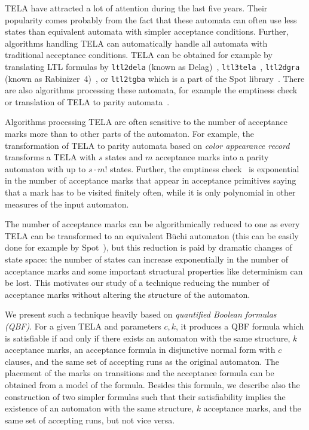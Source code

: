 \documentclass[runningheads]{llncs}
\begin{document}
TELA have attracted a lot of attention during the last five years.
Their popularity comes probably from the fact that these automata can
often use less states than equivalent automata with simpler acceptance
conditions. Further, algorithms handling TELA can automatically handle
all automata with traditional acceptance conditions. TELA can be
obtained for example by translating LTL formulas by \texttt{ltl2dela}
(known as Delag)~\cite{muller.17.gandalf},
\texttt{ltl3tela}~\cite{major.19.atva}, \texttt{ltl2dgra} (known as
Rabinizer~4)~\cite{kretinsky.18.cav}, or \texttt{ltl2tgba} which is a
part of the Spot library~\cite{duret.16.atva2}.  There are also
algorithms processing these automata, for example the emptiness
check~\cite{baier.19.atva} or translation of TELA to parity
automata~\cite{renkin.20.atva,casares.22.tacas}.

Algorithms processing TELA are often sensitive to the number of
acceptance marks more than to other parts of the automaton. For
example, the transformation of TELA to parity automata based on
\emph{color appearance record}~\cite{renkin.20.atva} transforms a TELA
with $s$ states and $m$ acceptance marks into a parity automaton with
up to $s\cdot m!$ states. Further, the emptiness
check~\cite{baier.19.atva} is exponential in the number of acceptance
marks that appear in acceptance primitives saying that a mark has to
be visited finitely often, while it is only polynomial in other
measures of the input automaton.

The number of acceptance marks can be algorithmically reduced to one
as every TELA can be transformed to an equivalent Büchi automaton
(this can be easily done for example by Spot~\cite{duret.16.atva2}),
but this reduction is paid by dramatic changes of state space: the
number of states can increase exponentially in the number of
acceptance marks and some important structural properties like
determinism can be lost. This motivates our study of a technique
reducing the number of acceptance marks without altering the structure
of the automaton.

We present such a technique heavily based on \emph{quantified Boolean
  formulas (QBF)}. For a given TELA and parameters $c,k$, it produces
a QBF formula which is satisfiable if and only if there exists an
automaton with the same structure, $k$ acceptance marks, an acceptance
formula in disjunctive normal form with $c$ clauses, and the same set
of accepting runs as the original automaton. The placement of the
marks on transitions and the acceptance formula can be obtained from a
model of the formula. Besides this formula, we describe also the
construction of two simpler formulas such that their satisfiability
implies the existence of an automaton with the same structure, $k$
acceptance marks, and the same set of accepting runs, but not vice
versa.
\end{document}
